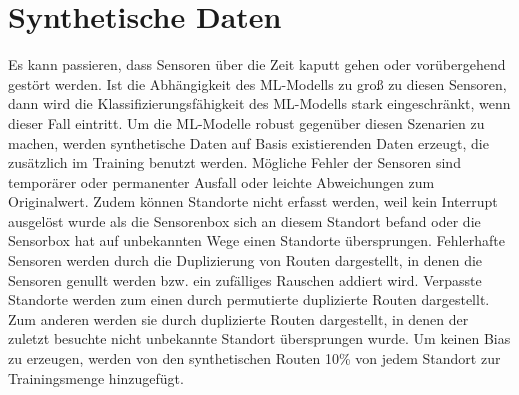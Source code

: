 \section{Synthetische Daten}
Es kann passieren, dass Sensoren über die Zeit kaputt gehen oder vorübergehend gestört werden.
Ist die Abhängigkeit des ML-Modells zu groß zu diesen Sensoren, dann wird die Klassifizierungsfähigkeit des ML-Modells stark eingeschränkt, wenn dieser Fall eintritt.
Um die ML-Modelle robust gegenüber diesen Szenarien zu machen, werden synthetische Daten auf Basis existierenden Daten erzeugt, die zusätzlich im Training benutzt werden.
\newpage
Mögliche Fehler der Sensoren sind temporärer oder permanenter Ausfall oder leichte Abweichungen zum Originalwert.
Zudem können Standorte nicht erfasst werden, weil kein Interrupt ausgelöst wurde als die Sensorenbox sich an diesem Standort befand
oder die Sensorbox hat auf unbekannten Wege einen Standorte übersprungen.
\newline
\newline
Fehlerhafte Sensoren werden durch die Duplizierung von Routen dargestellt, in denen die Sensoren genullt werden bzw. ein zufälliges Rauschen addiert wird.
Verpasste Standorte werden zum einen durch permutierte duplizierte Routen dargestellt.
Zum anderen werden sie durch duplizierte Routen dargestellt, in denen der zuletzt besuchte nicht unbekannte Standort übersprungen wurde.
Um keinen Bias zu erzeugen, werden von den synthetischen Routen 10\% von jedem Standort zur Trainingsmenge hinzugefügt.